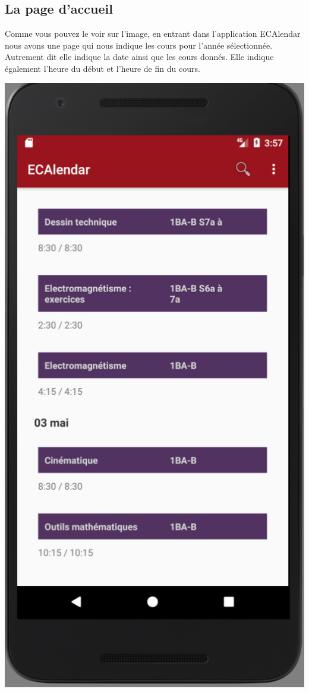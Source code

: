 \documentclass{article}
\begin{document}
	 \subsection{La page d'accueil}
	 Comme vous pouvez le voir sur l'image, en entrant dans l'application ECAlendar nous avons une page qui nous indique les cours pour l'ann\'ee s\'electionn\'ee. Autrement dit elle indique la date ainsi que les cours donn\'es. Elle indique \'egalement l'heure du début et l'heure de fin du cours.
	   \begin{center}
            \includegraphics[scale=0.4]{img/Page_Accueil.png}
        \end{center}
\end{document}
